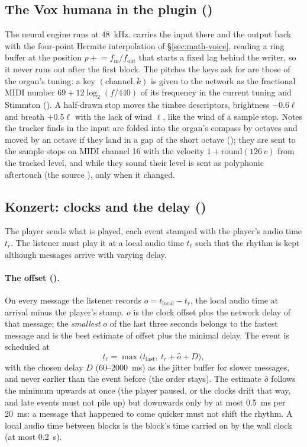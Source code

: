 \subsection{The Vox humana in the plugin ()}
\label{sec:math-voxstop}
The neural engine \citep{neuralrysum2} runs at \SI{48}{kHz}.  carries the input there and the
output back with the four-point Hermite interpolation of \S\ref{sec:math-voice}, reading a ring buffer at the position
$p \mathrel{+}= f_\mathrm{in}/f_\mathrm{out}$ that starts a fixed lag behind the writer, so it never runs out after the
first block. The pitches the keys ask for are those of the organ's tuning: a key $(\text{channel}, k)$ is given to the
network as the fractional MIDI number $69 + 12\log_2(f/440)$ of its frequency in the current tuning and Stimmton
(). A half-drawn stop moves the timbre descriptors, brightness $-0.6\ell$ and breath $+0.5\ell$ with the lack of
wind $\ell$, like the wind of a sample stop. Notes the tracker finds in the input are folded into the organ's compass by
octaves and moved by an octave if they land in a gap of the short octave (); they are sent to the sample
stops on MIDI channel 16 with the velocity $1 + \mathrm{round}(126\,v)$ from the tracked level, and while they sound their
level is sent as polyphonic aftertouch (the source ), only when it changed.

\subsection{Konzert: clocks and the delay ()}
\label{sec:math-konzert}
The player sends what is played, each event stamped with the player's audio time $t_r$. The listener must play it
at a local audio time $t_\ell$ such that the rhythm is kept although messages arrive with varying delay.

\paragraph{The offset ().} On every message the listener records $o = t_\mathrm{local} - t_r$, the local
audio time at arrival minus the player's stamp. $o$ is the clock offset plus the network delay of that message; the
\emph{smallest} $o$ of the last three seconds belongs to the fastest message and is the best estimate of offset plus the
minimal delay. The event is scheduled at
\begin{equation}
  t_\ell = \max\bigl(t_\mathrm{last},\ t_r + \hat o + D\bigr),
\end{equation}
with the chosen delay $D$ (60--\SI{2000}{ms}) as the jitter buffer for slower messages, and never earlier than the event
before (the order stays). The estimate $\hat o$ follows the minimum upwards at once (the player paused, or the clocks drift
that way, and late events must not pile up) but downwards only by at most \SI{0.5}{ms} per \SI{20}{ms}: a message that
happened to come quicker must not shift the rhythm. A local audio time between blocks is the block's time carried on by
the wall clock (at most \SI{0.2}{s}).

